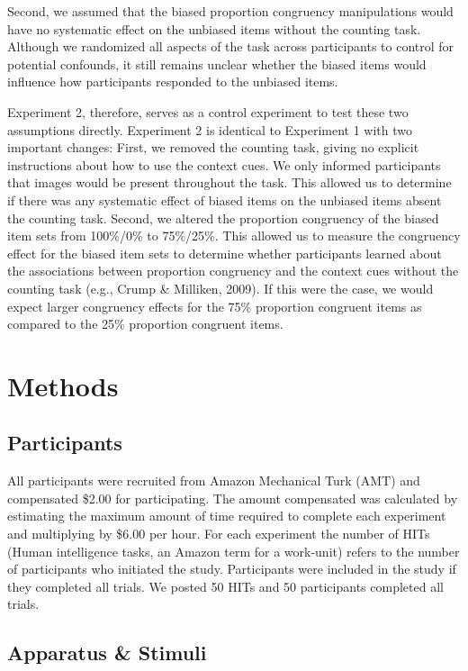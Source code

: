 \documentclass[english,,man,floatsintext]{apa6}
\begin{document}
Second, we assumed that the biased proportion congruency manipulations would have no systematic effect on the unbiased items without the counting task. Although we randomized all aspects of the task across participants to control for potential confounds, it still remains unclear whether the biased items would influence how participants responded to the unbiased items.

Experiment 2, therefore, serves as a control experiment to test these two assumptions directly. Experiment 2 is identical to Experiment 1 with two important changes: First, we removed the counting task, giving no explicit instructions about how to use the context cues. We only informed participants that images would be present throughout the task. This allowed us to determine if there was any systematic effect of biased items on the unbiased items absent the counting task. Second, we altered the proportion congruency of the biased item sets from 100\%/0\% to 75\%/25\%. This allowed us to measure the congruency effect for the biased item sets to determine whether participants learned about the associations between proportion congruency and the context cues without the counting task (e.g., Crump \& Milliken, 2009). If this were the case, we would expect larger congruency effects for the 75\% proportion congruent items as compared to the 25\% proportion congruent items.

\hypertarget{methods-1}{%
\section{Methods}\label{methods-1}}

\hypertarget{participants-1}{%
\subsection{Participants}\label{participants-1}}

All participants were recruited from Amazon Mechanical Turk (AMT) and compensated \$2.00 for participating. The amount compensated was calculated by estimating the maximum amount of time required to complete each experiment and multiplying by \$6.00 per hour. For each experiment the number of HITs (Human intelligence tasks, an Amazon term for a work-unit) refers to the number of participants who initiated the study. Participants were included in the study if they completed all trials. We posted 50 HITs and 50 participants completed all trials.

\hypertarget{apparatus-stimuli-1}{%
\subsection{Apparatus \& Stimuli}\label{apparatus-stimuli-1}}
\end{document}
